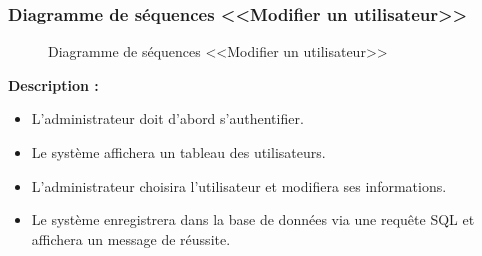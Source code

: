 \documentclass[12pt]{report}
\begin{document}
\newpage

\subsubsection{Diagramme de séquences <<Modifier un utilisateur>>}

\begin{figure}[h]
\centering
    \centerline{}
    \caption{Diagramme de séquences <<Modifier un utilisateur>>}
\end{figure}

\vspace{0.3in}

\textbf{Description :}

\begin{itemize}
    \item L'administrateur doit d'abord s'authentifier.
    \item Le système affichera un tableau des utilisateurs.
    \item L'administrateur choisira l'utilisateur et modifiera ses informations.
    \item Le système enregistrera dans la base de données via une requête SQL et affichera un message de réussite.
\end{itemize}
\end{document}
